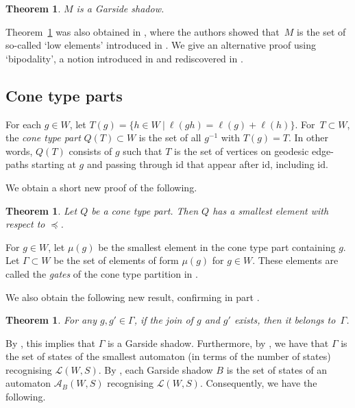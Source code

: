 \documentclass[11pt]{article}
\newtheorem{thm}[theo]{Theorem}
\theoremstyle{definition}
\numberwithin{equation}{section}
\newcommand{\id}{\mathrm{id}}
\begin{document}
\begin{thm}
	\label{thm:Shi2}
	$M$ is a Garside shadow.
\end{thm}

Theorem~\ref{thm:Shi2} was also obtained in \cite[Thm.~1.1(2)]{DHFM}, where the authors showed that~$M$ is the set of so-called `low elements' introduced in \cite{DH}. We give an alternative  proof using `bipodality', a notion introduced in \cite{DH} and rediscovered in \cite{OP}.

\subsection*{Cone type parts} 

For each $g\in W$, let $T(g)=\{h\in W \ | \ \ell(gh)=\ell(g)+\ell(h)\}$. For~$T\subset W$, the \emph{cone type part} $Q(T)\subset W$ is the set of all $g^{-1}$ with $T(g)=T$. In other words, $Q(T)$ consists of $g$ such that $T$ is the set of vertices on geodesic edge-paths starting at $g$ and passing through $\id$ that appear after $\id$, including $\id$. 

We obtain a short new proof of the following.

\begin{thm} 
	\label{thm:conetype}
	{\cite[Thm.~1]{Parkinson-Yau_2022}} Let $Q$ be a cone type part. Then $Q$ has a smallest element with respect to $\preceq$.
\end{thm}

For $g\in W$, let $\mu(g)$ be the smallest element in the cone type part containing $g$. Let $\Gamma\subset W$ be the set of elements of form $\mu(g)$ for $g\in W$. These elements are called the \textit{gates} of the cone type partition in \cite{Parkinson-Yau_2022}. 

We also obtain the following new result, confirming in part {\cite[Conj.~1]{Parkinson-Yau_2022}}.

\begin{thm} 
	\label{thm:conetype2}
	For any $g,g'\in \Gamma$, if the join of $g$ and $g'$ exists, then it belongs to~$\Gamma$. 
\end{thm}

By \cite[Prop~4.27(i)]{Parkinson-Yau_2022}, this implies that $\Gamma$ is a Garside shadow. Furthermore, by \cite[Cor.~4]{Parkinson-Yau_2022}, we have that $\Gamma$ is the set of states of the smallest automaton (in terms of the number of states) recognising $\mathcal{L}(W,S)$. By \cite[Thm.~1.2]{HNW}, each Garside shadow $B$ is the set of states of an automaton $\mathcal A_B(W,S)$ recognising $\mathcal{L}(W,S)$. Consequently, we have the following.
\end{document}
